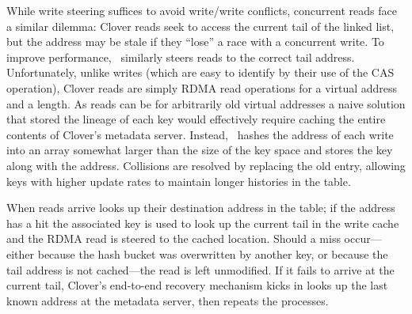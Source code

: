 While write steering suffices to avoid write/write conflicts,
concurrent reads face a similar dilemma: Clover reads seek to access
the current tail of the linked list, but the address may be stale if
they ``lose'' a race with a concurrent write.  To improve performance,
\sword\ similarly steers reads to the correct tail address.
%
Unfortunately, unlike writes (which are easy to identify by their use
of the CAS operation), Clover reads are simply RDMA read operations
for a virtual address and a length.
As reads can be for arbitrarily old virtual addresses a naive solution
that stored the lineage of each key would effectively require caching
the entire contents of Clover's metadata server.  Instead,
\sword\ hashes the address of each write into an array somewhat larger
than the size of the key space and stores the key along with the
address.  Collisions are resolved by replacing the old
entry, allowing keys with higher update rates to
maintain longer histories in the table.

When reads arrive {\sword} looks up their destination address in the
table; if the address has a hit the associated key is used to look up
the current tail in the write cache and the RDMA read is steered to
the cached location.  Should a miss occur---either because the hash
bucket was overwritten by another key, or because the tail address is
not cached---the read is left unmodified.  If it fails to arrive at
the current tail, Clover's end-to-end recovery mechanism kicks in
looks up the last known address at the metadata server, then repeats
the processes.



